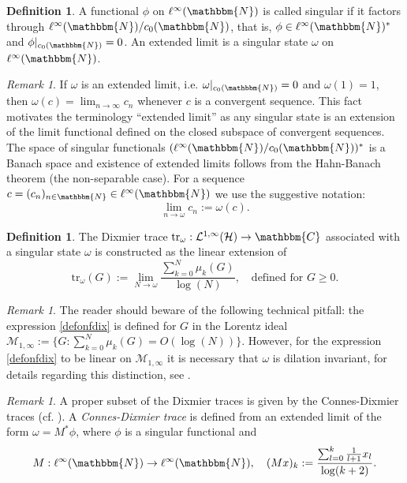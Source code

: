 \documentclass[10pt]{amsart}
\theoremstyle{remark}
\newtheorem{remark}[thm]{Remark}
\theoremstyle{definition}
\newtheorem{deef}[thm]{Definition}
\begin{document}
\begin{deef}
\label{definoofsingularsat}
A functional $\phi$ on $\ell^\infty({\mathbbm{N}})$ is called singular if it factors through $\ell^\infty({\mathbbm{N}})/c_0({\mathbbm{N}})$, that is, $\phi\in \ell^\infty({\mathbbm{N}})^*$ and  $\phi|_{c_0({\mathbbm{N}})}=0$. An extended limit is a singular state $\omega$ on $\ell^\infty({\mathbbm{N}})$.
\end{deef}

\begin{remark}
If $\omega$ is an extended limit, i.e. $\omega|_{c_0({\mathbbm{N}})}=0$ and $\omega(1)=1$, then $\omega(c)=\lim_{n\to \infty} c_n$ whenever $c$ is a convergent sequence. This fact motivates the terminology ``extended limit'' as any singular state is an extension of the limit functional defined on the closed subspace of convergent sequences. The space of singular functionals $(\ell^\infty({\mathbbm{N}})/c_0({\mathbbm{N}}))^*$ is a Banach space and existence of extended limits follows from the Hahn-Banach theorem (the non-separable case). For a sequence $c=(c_n)_{n\in {\mathbbm{N}}}\in \ell^\infty({\mathbbm{N}})$ we use the suggestive notation:
$$\lim_{n\to \omega}c_n:=\omega(c).$$
\end{remark}

\begin{deef}
\label{definoofdix}
The Dixmier trace ${\mathrm{t}\mathrm{r}}_\omega:\mathcal{L}^{1,\infty}({\mathcal{H}})\to {\mathbbm{C}}$ associated with a singular state $\omega$ is constructed as the linear extension of
\begin{equation}
\label{defonfdix}
{\mathrm{t}\mathrm{r}}_\omega(G):=\lim_{N\to \omega} \frac{\sum_{k=0}^N \mu_k(G)}{\log(N)}, \quad\mbox{defined for $G\geq 0$}.
\end{equation}
\end{deef}

\begin{remark}
The reader should beware of the following technical pitfall: the expression \eqref{defonfdix} is defined for $G$ in the Lorentz ideal $\mathcal{M}_{1,\infty}:=\{G: \sum_{k=0}^N \mu_k(G)=O(\log(N))\}$. However, for the expression \eqref{defonfdix} to be linear on $\mathcal{M}_{1,\infty}$ it is necessary that $\omega$ is dilation invariant, for details regarding this distinction, see \cite[Lemma 9.7.4]{sukolord}.
\end{remark}

\begin{remark}
\label{connesdixremark}
A proper subset of the Dixmier traces is given by the Connes-Dixmier traces (cf. \cite{c,pietsch,dixmieragain}). A \emph{Connes-Dixmier trace} is defined from an extended limit of the form $\omega=M^*\phi$, where $\phi$ is a singular functional and
$$M:\ell^\infty({\mathbbm{N}})\to \ell^\infty({\mathbbm{N}}),\quad (Mx)_k:=\frac{\sum_{l=0}^k\frac{1}{l+1}x_l}{\log(k+2)}.$$
\end{remark}
\end{document}
